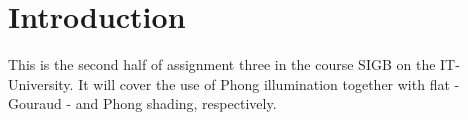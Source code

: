 \section{Introduction}

This is the second half of assignment three in the course SIGB on the
IT-University. It will cover the use of Phong illumination together with flat -
 Gouraud - and Phong shading, respectively.
